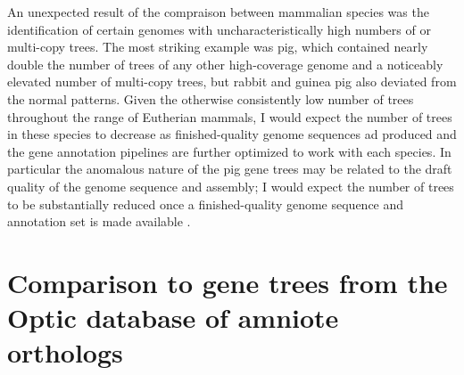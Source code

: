 An unexpected result of the compraison between mammalian species was
the identification of certain genomes with uncharacteristically high
numbers of \zcop or multi-copy trees. The most striking example was
pig, which contained nearly double the number of \zcop trees of any
other high-coverage \mammln genome and a noticeably elevated number of
multi-copy trees, but rabbit and guinea pig also deviated from the
normal patterns. Given the otherwise consistently low number of \zcop
trees throughout the range of Eutherian mammals, I would expect the
number of \zcop trees in these species to decrease as finished-quality
genome sequences ad produced and the gene annotation pipelines are
further optimized to work with each species. In particular the
anomalous nature of the pig gene trees may be related to the draft
quality of the genome sequence and assembly; I would expect the number
of \zcop trees to be substantially reduced once a finished-quality
genome sequence and annotation set is made available
\citep{Archibald2010}.


\section{Comparison to gene trees from the Optic database of amniote orthologs}

